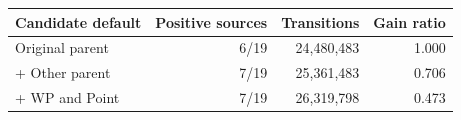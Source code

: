 \begin{tabular}{lrrr}
\toprule
Candidate default & Positive sources & Transitions & Gain ratio \\
\midrule
Original parent & 6/19 & 24,480,483 & 1.000 \\
+ Other parent & 7/19 & 25,361,483 & 0.706 \\
+ WP and Point & 7/19 & 26,319,798 & 0.473 \\
\bottomrule
\end{tabular}
